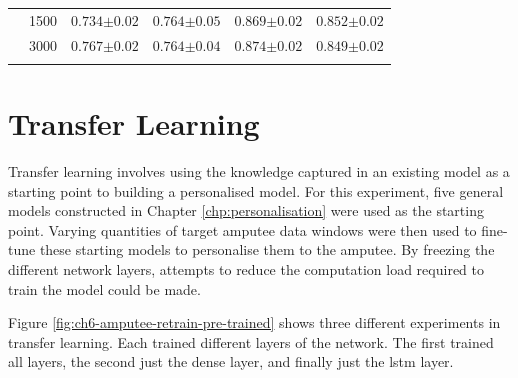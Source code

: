 \begin{table}[!hbt]
\begin{subtable}{\textwidth}
\begin{tabularx}{0.99\textwidth}{cr| *{4}{Y}}
             & 1500 & $0.734{\scriptscriptstyle\pm0.02}$                   & $\mathbf{0.764{\scriptscriptstyle\pm0.05}}$ & $0.869{\scriptscriptstyle\pm0.02}$          & $0.852{\scriptscriptstyle\pm0.02}$          \\
             & 3000 & $\mathbf{0.767{\scriptscriptstyle\pm0.02}}$          & $\mathbf{0.764{\scriptscriptstyle\pm0.04}}$ & $0.874{\scriptscriptstyle\pm0.02}$          & $0.849{\scriptscriptstyle\pm0.02}$          \\
                                                                                                                                                                                        \\
        \end{tabularx}
    \end{subtable}
\end{table}



\section{Transfer Learning}
\label{sec:amputee-transfer}
Transfer learning involves using the knowledge captured in an existing model as a starting point to building a personalised model. For this experiment, five general models constructed in Chapter \ref{chp:personalisation} were used as the starting point. Varying quantities of target amputee data windows were then used to fine-tune these starting models to personalise them to the amputee. By freezing the different network layers, attempts to reduce the computation load required to train the model could be made.

Figure \ref{fig:ch6-amputee-retrain-pre-trained} shows three different experiments in transfer learning. Each trained different layers of the network. The first trained all layers, the second just the dense layer, and finally just the \acrshort{lstm} layer.

